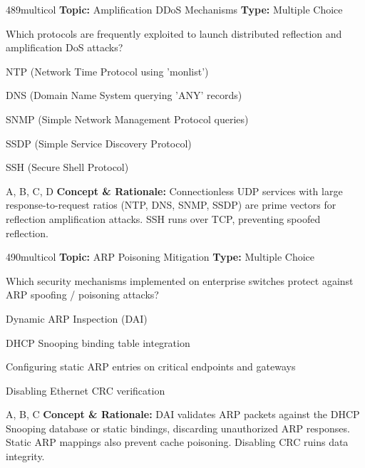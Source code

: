 \begin{qcard}{489}{multicol}
\textcolor{darkslate!75}{\small\textbf{Topic:} Amplification DDoS Mechanisms \hfill \textbf{Type:} Multiple Choice}\vspace{0.4em}\par
Which protocols are frequently exploited to launch distributed reflection and amplification DoS attacks?
\begin{qoptions}
\item NTP (Network Time Protocol using 'monlist')
\item DNS (Domain Name System querying 'ANY' records)
\item SNMP (Simple Network Management Protocol queries)
\item SSDP (Simple Service Discovery Protocol)
\item SSH (Secure Shell Protocol)
\end{qoptions}
\end{qcard}
\nopagebreak
\begin{explainbox}{A, B, C, D}
\textbf{Concept \& Rationale:} Connectionless UDP services with large response-to-request ratios (NTP, DNS, SNMP, SSDP) are prime vectors for reflection amplification attacks. SSH runs over TCP, preventing spoofed reflection.
\end{explainbox}

\begin{qcard}{490}{multicol}
\textcolor{darkslate!75}{\small\textbf{Topic:} ARP Poisoning Mitigation \hfill \textbf{Type:} Multiple Choice}\vspace{0.4em}\par
Which security mechanisms implemented on enterprise switches protect against ARP spoofing / poisoning attacks?
\begin{qoptions}
\item Dynamic ARP Inspection (DAI)
\item DHCP Snooping binding table integration
\item Configuring static ARP entries on critical endpoints and gateways
\item Disabling Ethernet CRC verification
\end{qoptions}
\end{qcard}
\nopagebreak
\begin{explainbox}{A, B, C}
\textbf{Concept \& Rationale:} DAI validates ARP packets against the DHCP Snooping database or static bindings, discarding unauthorized ARP responses. Static ARP mappings also prevent cache poisoning. Disabling CRC ruins data integrity.
\end{explainbox}

